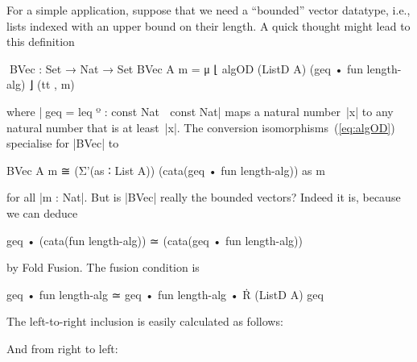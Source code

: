 For a simple application, suppose that we need a ``bounded'' vector datatype, i.e., lists indexed with an upper bound on their length.
A quick thought might lead to this definition
\begin{code}
^^^BVec : Set → Nat → Set
BVec A m = μ ⌊ algOD (ListD A) (geq • fun length-alg) ⌋ (tt , m)
\end{code}
where |^^^geq = leq º : const Nat ↝ const Nat| maps a natural number~|x| to any natural number that is at least~|x|.
The conversion isomorphisms~(\ref{eq:algOD}) specialise for |BVec| to
\begin{code}
BVec A m ≅ (Σ'(as ∶ List A)) (cata(geq • fun length-alg)) as m
\end{code}
for all |m : Nat|.
But is |BVec| really the bounded vectors?
Indeed it is, because we can deduce
\begin{code}
geq • (cata(fun length-alg)) ≃ (cata(geq • fun length-alg))
\end{code}
by Fold Fusion.
The fusion condition is
\begin{code}
geq • fun length-alg ≃ geq • fun length-alg • Ṙ (ListD A) geq
\end{code}
The left-to-right inclusion is easily calculated as follows:
And from right to left:
